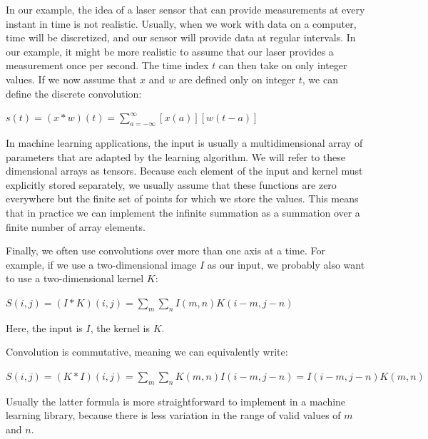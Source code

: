 \documentclass{report}
\begin{document}
\noindent In our example, the idea of a laser sensor that can provide measurements at every instant in time is not realistic. Usually, when we work with data on a computer, time will be discretized, and our sensor will provide data at regular intervals. In our example, it might be more realistic to assume that our laser provides a measurement once per second. The time index $t$ can then take on only integer values. If we now assume that $x$ and $w$ are defined only on integer $t$, we can define the discrete convolution:\newline\newline
    \centerline{$s(t) = (x * w)(t) = \sum_{a=-\infty}^{\infty}[x(a)][w(t-a)]$}\newline\newline
In machine learning applications, the input is usually a multidimensional array of parameters that are adapted by the learning algorithm. We will refer to these dimensional arrays as tensors. Because each element of the input and kernel must explicitly stored separately, we usually assume that these functions are zero everywhere but the finite set of points for which we store the values. This means that in practice we can implement the infinite summation as a summation over a finite number of array elements.\newline

\noindent Finally, we often use convolutions over more than one axis at a time. For example, if we use a two-dimensional image $I$ as our input, we probably also want to use a two-dimensional kernel $K$:\newline\newline
    \centerline{$S(i,j)=(I*K)(i,j)=\sum_m \sum_n I(m,n)K(i-m,j-n)$}\newline\newline
    
Here, the input is $I$, the kernel is $K$.\newline

Convolution is commutative, meaning we can equivalently write:\newline\newline
    \centerline{$S(i,j)=(K*I)(i,j)=\sum_m \sum_n K(m,n)I(i-m,j-n)=I(i-m,j-n)K(m,n)$}\newline\newline

Usually the latter formula is more straightforward to implement in a machine learning library, because there is less variation in the range of valid values of $m$ and $n$.\newline
\end{document}
